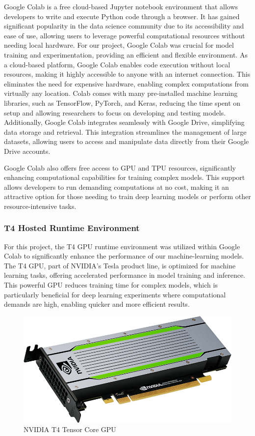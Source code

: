 Google Colab is a free cloud-based Jupyter notebook environment that allows developers to write and execute Python code through a browser. It has gained significant popularity in the data science community due to its accessibility and ease of use, allowing users to leverage powerful computational resources without needing local hardware. For our project, Google Colab was crucial for model training and experimentation, providing an efficient and flexible environment. As a cloud-based platform, Google Colab enables code execution without local resources, making it highly accessible to anyone with an internet connection. This eliminates the need for expensive hardware, enabling complex computations from virtually any location. Colab comes with many pre-installed machine learning libraries, such as TensorFlow, PyTorch, and Keras, reducing the time spent on setup and allowing researchers to focus on developing and testing models. Additionally, Google Colab integrates seamlessly with Google Drive, simplifying data storage and retrieval. This integration streamlines the management of large datasets, allowing users to access and manipulate data directly from their Google Drive accounts.

Google Colab also offers free access to GPU and TPU resources, significantly enhancing computational capabilities for training complex models. This support allows developers to run demanding computations at no cost, making it an attractive option for those needing to train deep learning models or perform other resource-intensive tasks.


\subsubsection{T4 Hosted Runtime Environment}

For this project, the T4 GPU runtime environment was utilized within Google Colab to significantly enhance the performance of our machine-learning models. The T4 GPU, part of NVIDIA's Tesla product line, is optimized for machine learning tasks, offering accelerated performance in model training and inference. This powerful GPU reduces training time for complex models, which is particularly beneficial for deep learning experiments where computational demands are high, enabling quicker and more efficient results.

\begin{figure}[htbp]
    \centering
    \includegraphics[width=6 cm]{4_ChapterMaterials/figuras/T4.png}
    \caption{NVIDIA T4 Tensor Core GPU\cite{nvidia_t4_image}}
    \end{figure}

